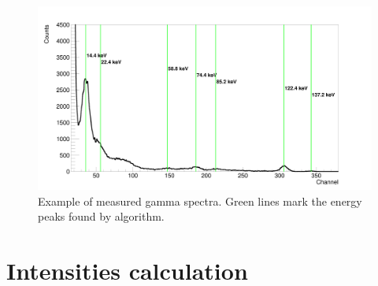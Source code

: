 \begin{figure}[H]
 \centering
 \includegraphics[scale=0.105, angle = 0]{./pictures/DataGraph.png}
 \caption{Example of measured gamma spectra. Green lines mark the energy peaks found by algorithm.}
 \label{Example}
 
\end{figure}

\section{Intensities calculation}
